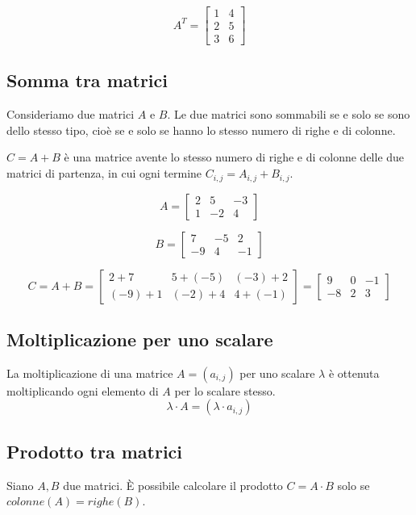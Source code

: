 $$
A^T =
\begin{bmatrix}
    1 & 4 \\
    2 & 5 \\
    3 & 6
\end{bmatrix}
$$

\subsection{Somma tra matrici}

Consideriamo due matrici $A$ e $B$. Le due matrici sono sommabili se
e solo se sono dello stesso tipo, cioè se e solo se hanno lo stesso
numero di righe e di colonne.

$C=A+B$ è una matrice avente lo stesso numero di righe e di colonne
delle due matrici di partenza, in cui ogni termine
$C_{i,j}=A_{i,j}+B_{i,j}$.

$$
A =
    \begin{bmatrix}
    2 & 5 & -3 \\
    1 & -2 & 4
    \end{bmatrix}
$$

$$
B =
    \begin{bmatrix}
    7 & -5 & 2 \\
    -9 & 4 & -1
    \end{bmatrix}
$$

$$
C = A+B = \begin{bmatrix}
    2+7 & 5+(-5) & (-3)+2 \\
    (-9)+1 & (-2)+4 & 4+(-1)
    \end{bmatrix}
    =
    \begin{bmatrix}
    9 & 0 & -1 \\
    -8 & 2 & 3
    \end{bmatrix}
$$

\subsection{Moltiplicazione per uno scalare}

La moltiplicazione di una matrice $A=(a_{i,j})$ per uno scalare $\lambda$ è ottenuta moltiplicando ogni elemento di $A$ per lo scalare stesso.
$$ \lambda \cdot A = (\lambda \cdot a_{i,j}) $$

\subsection{Prodotto tra matrici}

\begin{definition}
Siano $A, B$ due matrici. È possibile calcolare il prodotto $C=A \cdot B$
solo se $colonne(A) = righe(B)$.
\end{definition}

